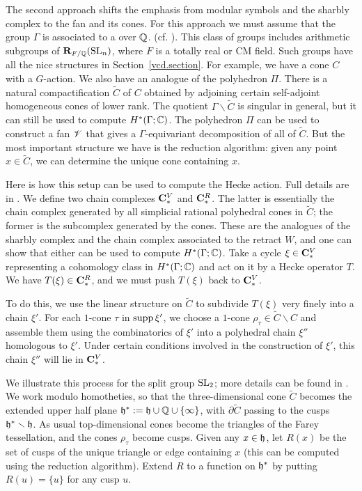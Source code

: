 The second approach shifts the emphasis from modular symbols and the
sharbly complex to the \Vor fan and its cones.  For this approach we
must assume that the group $\Gamma$ is associated to a
 over $\mathbb{Q}$.  (cf. \cite{ash77}).
This class of groups includes arithmetic subgroups of $\mathbf{R}_{F/\mathbb{Q}}
(\operatorname{SL}_{n})$, where $F$ is a totally real or CM field.  Such groups have
all the nice structures in Section~\ref{vcd.section}.  For example, we have
a cone $C$ with a $G$-action.  We also have an analogue of the \Vor
polyhedron $\Pi$.  There is a natural compactification $\tilde{C}$ of
$C$ obtained by adjoining certain self-adjoint homogeneous cones of
lower rank.  The quotient $\Gamma \backslash \tilde{C}$ is singular in
general, but it can still be used to compute $H^{*} (\Gamma ; \mathbb{C})$.  The
polyhedron $\Pi$ can be used to construct a fan $\mathscr V$ that gives a
$\Gamma$-equivariant decomposition of all of $\tilde{C}$.  But the
most important structure we have is the \Vor reduction algorithm:
given any point $x\in \tilde{C}$, we can determine the unique \Vor
cone containing $x$.

Here is how this setup can be used to compute the Hecke action.  Full
details are in \cite{msa, ccalg}.  We define two chain complexes
$\mathbf{C}^{V}_{*}$ and $\mathbf{C}^{R}_{*}$.  The latter is essentially the chain
complex generated by all simplicial rational polyhedral cones in
$\tilde{C}$; the former is the subcomplex generated by the \Vor cones.
These are the analogues of the sharbly complex and the chain complex
associated to the retract $W$, and one can show that either can be used
to compute $H^{*} (\Gamma ; \mathbb{C})$.  Take a cycle $\xi \in \mathbf{C}^{V}_{*}$
representing a cohomology class in $H^{*} (\Gamma ; \mathbb{C})$ and act on it
by a Hecke operator $T$.  We have $T (\xi) \in \mathbf{C}^{R}_{*}$, and we
must push $T (\xi)$ back to $\mathbf{C}^{V}_{*}$.

To do this, we use the linear structure on $\tilde{C}$ to subdivide $T
(\xi)$ very finely into a chain $\xi '$.  For each $1$-cone $\tau$ in
$\operatorname{supp} \xi '$, we choose a $1$-cone $\rho_{\tau}\in
\tilde{C}\smallsetminus C$ and assemble them using the combinatorics
of $\xi '$ into a polyhedral chain $\xi ''$ homologous to $\xi'$.
Under certain conditions involved in the construction of $\xi '$, this
chain $\xi ''$ will lie in $\mathbf{C}^{V}_{*}$.  

We illustrate this process for the split group $\operatorname{SL}_{2}$; more details
can be found in \cite{msa}.  We work modulo homotheties, so that the
three-dimensional cone $\tilde{C}$ becomes the extended upper
half plane $\mathfrak h^{*}:= \mathfrak h \cup \mathbb{Q} \cup \{\infty \} $, with $\partial
\tilde{C}$ passing to the cusps $\mathfrak h ^{*}\smallsetminus \mathfrak h $.  As
usual top-dimensional \Vor cones become the triangles of the Farey
tessellation, and the cones $\rho_{\tau}$ become cusps.  Given any
$x\in \mathfrak h$, let $R (x)$ be the set of cusps of the unique triangle or
edge containing $x$ (this can be computed using the \Vor reduction
algorithm).  Extend $R$ to a function on $\mathfrak h^{*}$ by putting $R (u) =
\{u \}$ for any cusp $u$.

